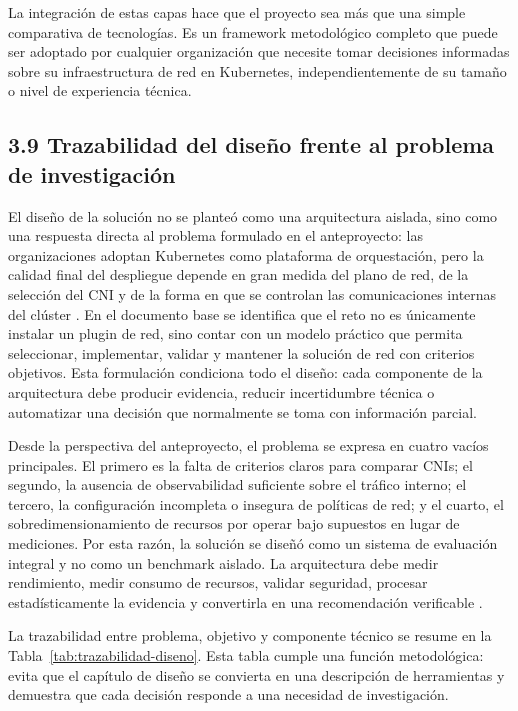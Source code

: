 \documentclass[journal]{IEEEtran}
\begin{document}
La integración de estas capas hace que el proyecto sea más que una simple comparativa de tecnologías. Es un framework metodológico completo que puede ser adoptado por cualquier organización que necesite tomar decisiones informadas sobre su infraestructura de red en Kubernetes, independientemente de su tamaño o nivel de experiencia técnica.


\subsection{3.9 Trazabilidad del diseño frente al problema de investigación}

El diseño de la solución no se planteó como una arquitectura aislada, sino como una respuesta directa al problema formulado en el anteproyecto: las organizaciones adoptan Kubernetes como plataforma de orquestación, pero la calidad final del despliegue depende en gran medida del plano de red, de la selección del CNI y de la forma en que se controlan las comunicaciones internas del clúster \cite{ref29}. En el documento base se identifica que el reto no es únicamente instalar un plugin de red, sino contar con un modelo práctico que permita seleccionar, implementar, validar y mantener la solución de red con criterios objetivos. Esta formulación condiciona todo el diseño: cada componente de la arquitectura debe producir evidencia, reducir incertidumbre técnica o automatizar una decisión que normalmente se toma con información parcial.

Desde la perspectiva del anteproyecto, el problema se expresa en cuatro vacíos principales. El primero es la falta de criterios claros para comparar CNIs; el segundo, la ausencia de observabilidad suficiente sobre el tráfico interno; el tercero, la configuración incompleta o insegura de políticas de red; y el cuarto, el sobredimensionamiento de recursos por operar bajo supuestos en lugar de mediciones. Por esta razón, la solución se diseñó como un sistema de evaluación integral y no como un benchmark aislado. La arquitectura debe medir rendimiento, medir consumo de recursos, validar seguridad, procesar estadísticamente la evidencia y convertirla en una recomendación verificable \cite{ref29}.

La trazabilidad entre problema, objetivo y componente técnico se resume en la Tabla~\ref{tab:trazabilidad-diseno}. Esta tabla cumple una función metodológica: evita que el capítulo de diseño se convierta en una descripción de herramientas y demuestra que cada decisión responde a una necesidad de investigación.
\end{document}
